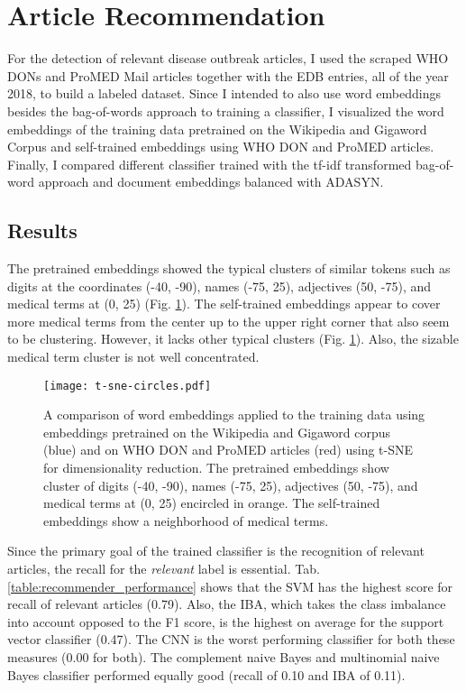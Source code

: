 \section{Article Recommendation}
  For the detection of relevant disease outbreak articles, I used the scraped WHO DONs and ProMED Mail articles together with the EDB entries, all of the year 2018, to build a labeled dataset.
  Since I intended to also use word embeddings besides the bag-of-words approach to training a classifier, I visualized the word embeddings of the training data pretrained on the Wikipedia and Gigaword Corpus and self-trained embeddings using WHO DON and ProMED articles.
  Finally, I compared different classifier trained with the tf-idf transformed bag-of-word approach and document embeddings balanced with ADASYN.

\subsection{Results}
  The pretrained embeddings showed the typical clusters of similar tokens such as digits at the coordinates (-40, -90), names (-75, 25), adjectives (50, -75), and medical terms at (0, 25) (Fig. \ref{fig:t-sne}).
  The self-trained embeddings appear to cover more medical terms from the center up to the upper right corner that also seem to be clustering.
  However, it lacks other typical clusters (Fig. \ref{fig:t-sne}).
  Also, the sizable medical term cluster is not well concentrated.
  \begin{figure}[h!]
    \centering
    \texttt{[image: t-sne-circles.pdf]}
    \caption{A comparison of word embeddings applied to the training data using embeddings pretrained on the Wikipedia and Gigaword corpus (blue) and on WHO DON and ProMED articles (red) using t-SNE for dimensionality reduction. The pretrained embeddings show cluster of digits (-40, -90), names (-75, 25), adjectives (50, -75), and medical terms at (0, 25) encircled in orange. The self-trained embeddings show a neighborhood of medical terms.}
  \label{fig:t-sne}
  \end{figure}

  Since the primary goal of the trained classifier is the recognition of relevant articles, the recall for the \textsl{relevant} label is essential.
  Tab. \ref{table:recommender_performance} shows that the SVM has the highest score for recall of relevant articles (0.79).
  Also, the IBA, which takes the class imbalance into account opposed to the F1 score, is the highest on average for the support vector classifier (0.47).
  The CNN is the worst performing classifier for both these measures (0.00 for both).
  The complement naive Bayes and multinomial naive Bayes classifier performed equally good (recall of 0.10 and IBA of 0.11).

